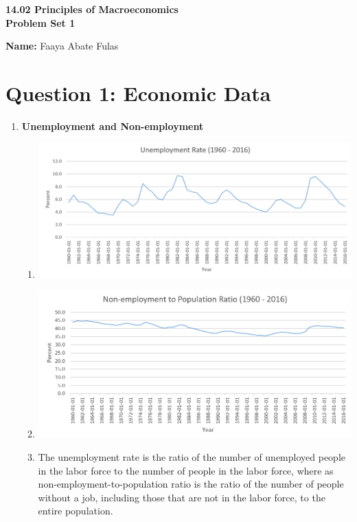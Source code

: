 \documentclass[a4paper, 11pt]{article}
\begin{document}
\begin{center}
\LARGE \bf 14.02 Principles of Macroeconomics\\ Problem Set 1
\end{center}

\vspace{1cm} 
\noindent\textbf{Name: }Faaya Abate Fulas \\

\section*{Question 1: Economic Data}
\begin{enumerate}[label=\textbf{(\alph*)}]
\item \textbf{Unemployment and Non-employment}
\begin{enumerate}[label=\textbf{\arabic*.}]
\item \includegraphics[scale=0.7]{unemployment_rate}
\item \includegraphics[scale=0.8]{non-employment}
\item The unemployment rate is the ratio of the number of unemployed people in the labor force to the number of people in the labor force, where as non-employment-to-population ratio is the ratio of the number of people without a job, including those that are not in the labor force, to the entire population. \\


\end{enumerate}
\end{enumerate}
\end{document}
